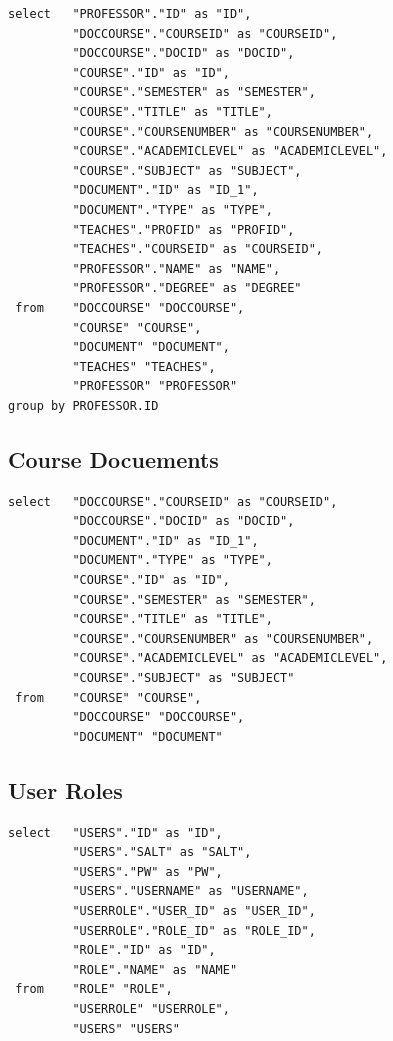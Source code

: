 \documentclass[11pt]{article}
\begin{document}
\begin{verbatim}
select   "PROFESSOR"."ID" as "ID",
         "DOCCOURSE"."COURSEID" as "COURSEID",
         "DOCCOURSE"."DOCID" as "DOCID",
         "COURSE"."ID" as "ID",
         "COURSE"."SEMESTER" as "SEMESTER",
         "COURSE"."TITLE" as "TITLE",
         "COURSE"."COURSENUMBER" as "COURSENUMBER",
         "COURSE"."ACADEMICLEVEL" as "ACADEMICLEVEL",
         "COURSE"."SUBJECT" as "SUBJECT",
         "DOCUMENT"."ID" as "ID_1",
         "DOCUMENT"."TYPE" as "TYPE",
         "TEACHES"."PROFID" as "PROFID",
         "TEACHES"."COURSEID" as "COURSEID",
         "PROFESSOR"."NAME" as "NAME",
         "PROFESSOR"."DEGREE" as "DEGREE" 
 from    "DOCCOURSE" "DOCCOURSE",
         "COURSE" "COURSE",
         "DOCUMENT" "DOCUMENT",
         "TEACHES" "TEACHES",
         "PROFESSOR" "PROFESSOR" 
group by PROFESSOR.ID
\end{verbatim}
\subsection{Course Docuements}
\label{sec-5-5}



\begin{verbatim}
select   "DOCCOURSE"."COURSEID" as "COURSEID",
         "DOCCOURSE"."DOCID" as "DOCID",
         "DOCUMENT"."ID" as "ID_1",
         "DOCUMENT"."TYPE" as "TYPE",
         "COURSE"."ID" as "ID",
         "COURSE"."SEMESTER" as "SEMESTER",
         "COURSE"."TITLE" as "TITLE",
         "COURSE"."COURSENUMBER" as "COURSENUMBER",
         "COURSE"."ACADEMICLEVEL" as "ACADEMICLEVEL",
         "COURSE"."SUBJECT" as "SUBJECT" 
 from    "COURSE" "COURSE",
         "DOCCOURSE" "DOCCOURSE",
         "DOCUMENT" "DOCUMENT"
\end{verbatim}
\subsection{User Roles}
\label{sec-5-6}



\begin{verbatim}
select   "USERS"."ID" as "ID",
         "USERS"."SALT" as "SALT",
         "USERS"."PW" as "PW",
         "USERS"."USERNAME" as "USERNAME",
         "USERROLE"."USER_ID" as "USER_ID",
         "USERROLE"."ROLE_ID" as "ROLE_ID",
         "ROLE"."ID" as "ID",
         "ROLE"."NAME" as "NAME" 
 from    "ROLE" "ROLE",
         "USERROLE" "USERROLE",
         "USERS" "USERS"
\end{verbatim}
\end{document}
